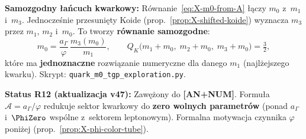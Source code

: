 \begin{theorem}[Uniwersalna sta\l{}a konfinementowa
  $\mathcal{A} = a_\Gamma / \varphi$]
\medskip\noindent
\textbf{Samozgodny \l{}a\'ncuch kwarkowy:}
R\'ownanie~\eqref{eq:X-m0-from-A} \l{}\k{a}czy $m_0$ z~$m_1$ i~$m_3$.
Jednocze\'snie przesuni\k{e}ty Koide
(prop.~\ref{prop:X-shifted-koide}) wyznacza $m_3$ przez $m_1$, $m_2$
i~$m_0$. To tworzy \textbf{r\'ownanie samozgodne}:
\begin{equation}\label{eq:X-self-consistent}
  m_0 = \frac{a_\Gamma}{\varphi}\,
  \frac{m_3(m_0)}{m_1},
  \qquad
  Q_K\bigl(m_1 + m_0,\; m_2 + m_0,\; m_3 + m_0\bigr) = \tfrac{3}{2},
\end{equation}
kt\'ore ma \textbf{jednoznaczne} rozwi\k{a}zanie numeryczne
dla danego $m_1$ (najl\.zejszego kwarku).
Skrypt: \texttt{quark\_m0\_tgp\_exploration.py}.

\medskip\noindent
\textbf{Status R12 (aktualizacja v47):}
Zawężony do \textbf{[AN+NUM]}. Formuła $\mathcal{A} = a_\Gamma/\varphi$
redukuje sektor kwarkowy do \textbf{zero wolnych parametr\'ow}
(ponad $a_\Gamma$ i~$\PhiZero$ wsp\'olne z~sektorem
leptonowym). Formalna motywacja czynnika $\varphi$ poni\.zej
(prop.~\ref{prop:X-phi-color-tube}).
\end{theorem}

